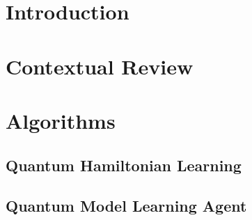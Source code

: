 
\part*{Introduction}\label{part:intro}

\part{Contextual Review}\label{part:contextual_review}

\part{Algorithms}\label{part:algorithms}
    \chapter{Quantum Hamiltonian Learning}\label{chapter:qhl}
        
    \chapter{Quantum Model Learning Agent}\label{chapter:qmla}
        
%         

